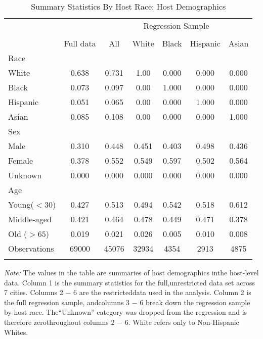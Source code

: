 \begin{table}[htbp]
\caption{Summary Statistics By Host Race: Host Demographics}
\begin{center}%
\small\begin{tabular}{l c | c | c c c c}
& \multicolumn{1}{c}{} & \multicolumn{5}{c}{Regression Sample}
\\
 \cmidrule(r){3-7}
\\
 & \multicolumn{1}{c}{Full data} & \multicolumn{1}{c}{All} & White & Black & Hispanic & Asian
\\
\hline\hline\noalign{\smallskip} 
 Race &&&&&& \\
 \hspace{10bp}White & 0.638 & 0.731 &  1.00 & 0.000 &  0.000 & 0.000 \\  \hspace{10bp}Black & 0.073 & 0.097 &  0.00 & 1.000 &  0.000 & 0.000 \\  \hspace{10bp}Hispanic & 0.051 & 0.065 &  0.00 & 0.000 &  1.000 & 0.000 \\  \hspace{10bp}Asian & 0.085 & 0.108 &  0.00 & 0.000 &  0.000 & 1.000 \\  Sex &&&&&& \\
 \hspace{10bp}Male & 0.310 & 0.448 &  0.451 & 0.403 &  0.498 & 0.436 \\  \hspace{10bp}Female & 0.378 & 0.552 &  0.549 & 0.597 &  0.502 & 0.564 \\  \hspace{10bp}Unknown & 0.000 & {0.000} & {0.000} &  {0.000}  & {0.000}  & {0.000} \\  Age &&&&&& \\
 \hspace{10bp}Young($<30$) & 0.427 & 0.513 &  0.494 & 0.542 &  0.518 & 0.612 \\  \hspace{10bp}Middle-aged & 0.421 & 0.464 &  0.478 & 0.449 &  0.471 & 0.378 \\  \hspace{10bp}Old ($>65$) &               0.019 & 0.021 &  0.026 & 0.005 &  0.010 & 0.008 \\ \hline
Observations & 69000 & 45076 & 32934 & 4354 & 2913 & 4875 
\\
\hline\hline\noalign{\smallskip} \end{tabular} 
\begin{minipage}{6in}
{\it Note:} The values in the table are summaries of host demographics inthe host-level data. Column 1 is the summary statistics for the full,unrestricted data set across 7 cities. Columns 2 $-$ 6 are the restricteddata used in the analysis. Column 2 is the full regression sample, andcolumns 3 $-$ 6 break down the regression sample by host race. The“Unknown” category was dropped from the regression and is therefore zerothroughout columns 2 $-$ 6. White refers only to Non-Hispanic Whites.\end{minipage}
\end{center}
\end{table}
